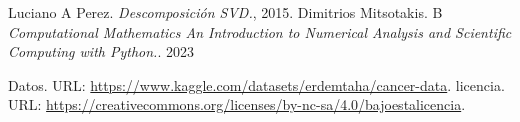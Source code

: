 \documentclass[a4paper,10pt,twocolumn]{article}
\begin{document}
		
	





\begin{thebibliography}{99}
	 Luciano A Perez. \emph{Descomposición SVD.}, 2015.
	 Dimitrios Mitsotakis. B \emph{Computational Mathematics An Introduction to Numerical Analysis and Scientific Computing with Python.}. 2023

	 Datos. URL: \href{https://www.kaggle.com/datasets/erdemtaha/cancer-data}
{https://www.kaggle.com/datasets/erdemtaha/cancer-data}.
 licencia. URL: \href{https://creativecommons.org/licenses/by-nc-sa/4.0/bajoestalicencia}
{https://creativecommons.org/licenses/by-nc-sa/4.0/bajoestalicencia}.
\end{thebibliography}


\label{end}
\end{document}
